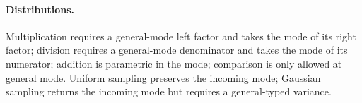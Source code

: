 \paragraph{Distributions.}

Multiplication requires a general-mode left factor and takes the mode of its right factor; division requires a general-mode denominator and takes the mode of its numerator; addition is parametric in the mode; comparison is only allowed at general mode. Uniform sampling preserves the incoming mode; Gaussian sampling returns the incoming mode but requires a general-typed variance.
